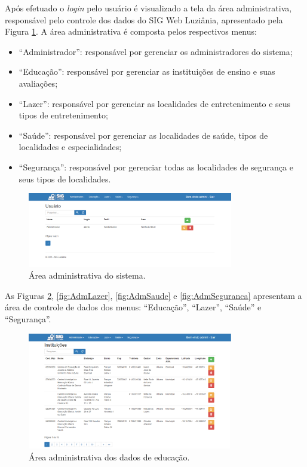 Após efetuado o \textit{login} pelo usuário é visualizado a tela da área administrativa, responsável pelo controle dos dados do SIG Web Luziânia, apresentado pela Figura \ref{fig:AreaAdministrativa}.  A área administrativa é composta pelos respectivos menus:

\begin{itemize}
\item “Administrador”: responsável por gerenciar os administradores do sistema;
\item “Educação”: responsável por gerenciar as instituições de ensino e suas avaliações;
\item “Lazer”: responsável por gerenciar as localidades de entretenimento e seus tipos de entretenimento;
\item “Saúde”: responsável por gerenciar as localidades de saúde, tipos de localidades e especialidades;
\item “Segurança”: responsável por gerenciar todas as localidades de segurança e seus tipos de localidades.
\end{itemize}

\newpage

\begin{figure}[h]
\centering
\includegraphics[width=0.80\textwidth]{./img/cap_IV/18-AreaAdministrativa}
\caption{Área administrativa do sistema.}
\label{fig:AreaAdministrativa}
\end{figure}

As Figuras \ref{fig:AdmEducacao}, \ref{fig:AdmLazer}, \ref{fig:AdmSaude} e \ref{fig:AdmSeguranca} apresentam a área de controle de dados dos menus: “Educação”, “Lazer”, “Saúde” e “Segurança”.

\begin{figure}[h]
\centering
\includegraphics[width=0.80\textwidth]{./img/cap_IV/19-AdmEducacao}
\caption{Área administrativa dos dados de educação.}
\label{fig:AdmEducacao}
\end{figure}

